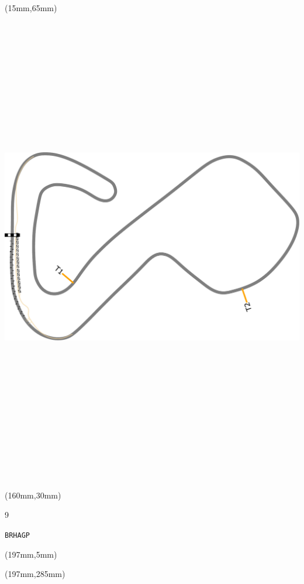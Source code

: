 \begin{textblock*}{185mm}(15mm,65mm)%
\centering
\mbox{\includegraphics[width=185mm,height=210mm,keepaspectratio]{PT/BRHAGP.pdf}}
\end{textblock*}
\begin{textblock*}{40mm}(160mm,30mm)%
\Large
\par{} 
\par9 
\par\hfill\tiny\tt BRHAGP\\
\end{textblock*}
\begin{textblock*}{20mm}(197mm,5mm)%
\fbox{\thepage}
\label{BRHAGP}
\end{textblock*}
\begin{textblock*}{20mm}(197mm,285mm)%
\fbox{\thepage}
\end{textblock*}

